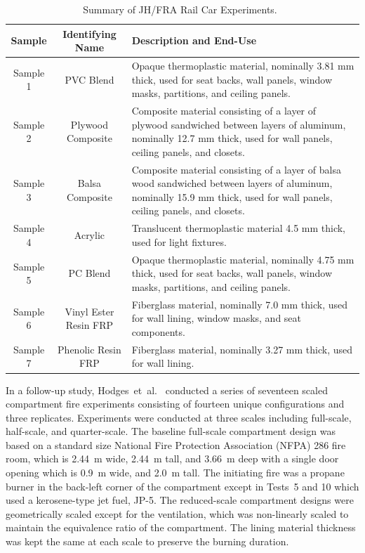 \begin{table}[!htb]
\centering
\caption[Summary of JH/FRA Materials]{Summary of JH/FRA Rail Car Experiments.~\cite{Luo:FRA2019}}
\begin{tabular}{|c|c|p{4in}|}
\hline
Sample & Identifying Name & Description and End-Use \\ \hline \hline
Sample 1    & PVC Blend             & Opaque thermoplastic material, nominally 3.81 mm thick, used for seat backs, wall panels, window masks, partitions, and ceiling panels. \\ \hline
Sample 2    & Plywood Composite     & Composite material consisting of a layer of plywood sandwiched between layers of aluminum, nominally 12.7 mm thick, used for wall panels, ceiling panels, and closets. \\ \hline
Sample 3    & Balsa Composite       & Composite material consisting of a layer of balsa wood sandwiched between layers of aluminum, nominally 15.9 mm thick, used for wall panels, ceiling panels, and closets.  \\ \hline
Sample 4    & Acrylic               & Translucent thermoplastic material 4.5 mm thick, used for light fixtures.  \\ \hline
Sample 5    & PC Blend              & Opaque thermoplastic material, nominally 4.75 mm thick, used for seat backs, wall panels, window masks, partitions, and ceiling panels. \\ \hline
Sample 6    & Vinyl Ester Resin FRP & Fiberglass material, nominally 7.0 mm thick, used for wall lining, window masks, and seat components. \\ \hline
Sample 7    & Phenolic Resin FRP    & Fiberglass material, nominally 3.27 mm thick, used for wall lining. \\ \hline
\end{tabular}
\label{JH_FRA_materials_table}
\end{table}

In a follow-up study, Hodges~et~al.~\cite{Hodges:FRA22} conducted a series of seventeen scaled compartment fire experiments consisting of fourteen unique configurations and three replicates. Experiments were conducted at three scales including full-scale, half-scale, and quarter-scale. The baseline full-scale compartment design was based on a standard size National Fire Protection Association (NFPA) 286 fire room, which is 2.44~m wide, 2.44~m tall, and 3.66~m deep with a single door opening which is 0.9~m wide, and 2.0~m tall. The initiating fire was a propane burner in the back-left corner of the compartment except in Tests~5 and 10 which used a kerosene-type jet fuel, JP-5. The reduced-scale compartment designs were geometrically scaled except for the ventilation, which was non-linearly scaled to maintain the equivalence ratio of the compartment. The lining material thickness was kept the same at each scale to preserve the burning duration.

